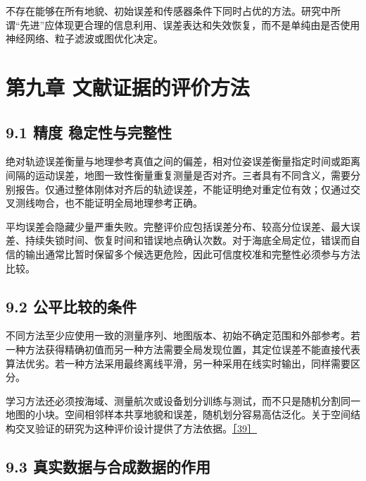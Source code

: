 不存在能够在所有地貌、初始误差和传感器条件下同时占优的方法。研究中所谓``先进''应体现更合理的信息利用、误差表达和失效恢复，而不是单纯由是否使用神经网络、粒子滤波或图优化决定。

\hypertarget{ux7b2cux4e5dux7ae0-ux6587ux732eux8bc1ux636eux7684ux8bc4ux4ef7ux65b9ux6cd5}{%
\section{第九章 文献证据的评价方法}\label{ux7b2cux4e5dux7ae0-ux6587ux732eux8bc1ux636eux7684ux8bc4ux4ef7ux65b9ux6cd5}}

\hypertarget{ux7cbeux5ea6-ux7a33ux5b9aux6027ux4e0eux5b8cux6574ux6027}{%
\subsection{9.1 精度 稳定性与完整性}\label{ux7cbeux5ea6-ux7a33ux5b9aux6027ux4e0eux5b8cux6574ux6027}}

绝对轨迹误差衡量与地理参考真值之间的偏差，相对位姿误差衡量指定时间或距离间隔的运动误差，地图一致性衡量重复测量是否对齐。三者具有不同含义，需要分别报告。仅通过整体刚体对齐后的轨迹误差，不能证明绝对重定位有效；仅通过交叉测线吻合，也不能证明全局地理参考正确。

平均误差会隐藏少量严重失败。完整评价应包括误差分布、较高分位误差、最大误差、持续失锁时间、恢复时间和错误地点确认次数。对于海底全局定位，错误而自信的输出通常比暂时保留多个候选更危险，因此可信度校准和完整性必须参与方法比较。

\hypertarget{ux516cux5e73ux6bd4ux8f83ux7684ux6761ux4ef6}{%
\subsection{9.2 公平比较的条件}\label{ux516cux5e73ux6bd4ux8f83ux7684ux6761ux4ef6}}

不同方法至少应使用一致的测量序列、地图版本、初始不确定范围和外部参考。若一种方法获得精确初值而另一种方法需要全局发现位置，其定位误差不能直接代表算法优劣。若一种方法采用最终离线平滑，另一种采用在线实时输出，同样需要区分。

学习方法还必须按海域、测量航次或设备划分训练与测试，而不只是随机分割同一地图的小块。空间相邻样本共享地貌和误差，随机划分容易高估泛化。关于空间结构交叉验证的研究为这种评价设计提供了方法依据。\href{https://doi.org/10.1111/ecog.02881}{［39］}

\hypertarget{ux771fux5b9eux6570ux636eux4e0eux5408ux6210ux6570ux636eux7684ux4f5cux7528}{%
\subsection{9.3 真实数据与合成数据的作用}\label{ux771fux5b9eux6570ux636eux4e0eux5408ux6210ux6570ux636eux7684ux4f5cux7528}}

